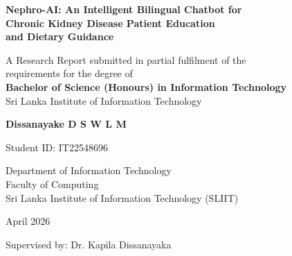 \documentclass[12pt,a4paper]{report}
\begin{document}
\begin{titlepage}
\thispagestyle{empty}
\centering
\vspace*{0.6cm}

{\LARGE\bfseries Nephro-AI: An Intelligent Bilingual Chatbot for\\[3pt]
Chronic Kidney Disease Patient Education\\[3pt]
and Dietary Guidance\par}

\vspace{0.8cm}

{\large A Research Report submitted in partial fulfilment of the\\
requirements for the degree of\\[3pt]
\textbf{Bachelor of Science (Honours) in Information Technology}\\[3pt]
Sri Lanka Institute of Information Technology\par}

\vspace{0.8cm}

{\large\textbf{Dissanayake D S W L M}\par}
\vspace{0.25cm}
{\large Student ID: IT22548696{\hspace{4cm}}\par}

\vspace{0.8cm}

{\large Department of Information Technology\\
Faculty of Computing\\
Sri Lanka Institute of Information Technology (SLIIT)\par}

\vspace{0.8cm}

{\large April 2026\par}

\vspace{0.8cm}

{\normalsize Supervised by: Dr. Kapila Dissanayaka\par}
\vspace{0.25cm}
\vspace{0.2cm}

\end{titlepage}

\newpage
\thispagestyle{plain}
\end{document}
